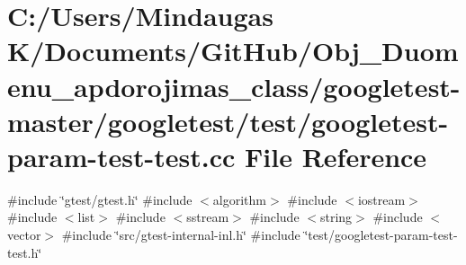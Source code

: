 \hypertarget{googletest-master_2googletest_2test_2googletest-param-test-test_8cc}{}\section{C\+:/\+Users/\+Mindaugas K/\+Documents/\+Git\+Hub/\+Obj\+\_\+\+Duomenu\+\_\+apdorojimas\+\_\+class/googletest-\/master/googletest/test/googletest-\/param-\/test-\/test.cc File Reference}
\label{googletest-master_2googletest_2test_2googletest-param-test-test_8cc}
{\ttfamily \#include \char`\"{}gtest/gtest.\+h\char`\"{}}\newline
{\ttfamily \#include $<$algorithm$>$}\newline
{\ttfamily \#include $<$iostream$>$}\newline
{\ttfamily \#include $<$list$>$}\newline
{\ttfamily \#include $<$sstream$>$}\newline
{\ttfamily \#include $<$string$>$}\newline
{\ttfamily \#include $<$vector$>$}\newline
{\ttfamily \#include \char`\"{}src/gtest-\/internal-\/inl.\+h\char`\"{}}\newline
{\ttfamily \#include \char`\"{}test/googletest-\/param-\/test-\/test.\+h\char`\"{}}\newline
